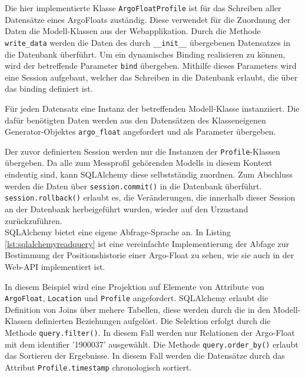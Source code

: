 

Die hier implementierte Klasse \texttt{ArgoFloatProfile} ist für das Schreiben aller Datensätze eines ArgoFloats zuständig. Diese verwendet für die Zuordnung der Daten die Modell-Klassen aus der Webapplikation. Durch die Methode \texttt{write\_data} werden die Daten des durch \texttt{\_\_init\_\_} übergebenen Datensatzes in die Datenbank überführt.
Um ein dynamisches Binding realisieren zu können, wird der betreffende Parameter \texttt{bind} übergeben. Mithilfe dieses Parameters wird eine Session aufgebaut, welcher das Schreiben in die Datenbank erlaubt, die über das binding definiert ist.

Für jeden Datensatz eine Instanz der betreffenden Modell-Klasse instanziiert. Die dafür benötigten Daten werden aus den Datensätzen des Klasseneigenen Generator-Objektes \texttt{argo\_float} angefordert und als Parameter übergeben.

Der zuvor definierten Session werden nur die Instanzen der \texttt{Profile}-Klassen übergeben. Da alle zum Messprofil gehörenden Modells in diesem Kontext eindeutig sind, kann SQLAlchemy diese selbstständig zuordnen.
Zum Abschluss werden die Daten über \texttt{session.commit()} in die Datenbank überführt.
\texttt{session.rollback()} erlaubt es, die Veränderungen, die innerhalb dieser Session an der Datenbank herbeigeführt wurden, wieder auf den Urzustand zurückzuführen.  \\

SQLAlchemy bietet eine eigene Abfrage-Sprache an. In Listing \ref{lst:sqlalchemyreadquery} ist eine vereinfachte Implementierung der Abfage zur Bestimmung der Positionshistorie einer Argo-Float zu sehen, wie sie auch in der Web-API implementiert ist. 


In diesem Beispiel wird eine Projektion auf Elemente von Attribute von \texttt{ArgoFloat}, \texttt{Location} und \texttt{Profile} angefordert. SQLAlchemy erlaubt die Definition von Joins über mehere Tabellen, diese werden durch die in den Modell-Klassen definierten Beziehungen aufgelöst. Die Selektion erfolgt durch die Methode \texttt{query.filter()}. In diesem Fall werden nur Relationen der Argo-Float mit dem identifier '1900037' ausgewählt. Die Methode \texttt{query.order\_by()} erlaubt das Sortieren der Ergebnisse. In diesem Fall werden die Datensätze durch das Attribut \texttt{Profile.timestamp} chronologisch sortiert.
\\

